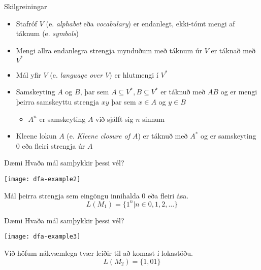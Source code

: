 \documentclass[handout]{beamer}
\begin{document}
\begin{frame}{Skilgreiningar}
    \begin{itemize}
        \item Stafróf $V$ (e. \emph{alphabet} eða \emph{vocabulary}) er endanlegt, ekki-tómt mengi af táknum (e. \emph{symbols})
        \item Mengi allra endanlegra strengja mynduðum með táknum úr $V$ er táknað með $V^*$
        \item Mál yfir $V$ (e. \emph{language over $V$}) er hlutmengi í $V^*$
        \item Samskeyting $A$ og $B$, þar sem $A\subseteq V^*,B\subseteq V^*$ er táknuð með $AB$ og er mengi þeirra samskeyttu strengja $xy$ þar sem $x\in A$ og $y \in B$
        \begin{itemize}
            \item $A^n$ er samskeyting $A$ við sjálft sig $n$ sinnum
        \end{itemize}
        \item Kleene lokun $A$ (e. \emph{Kleene closure of $A$}) er táknuð með $A^*$ og er samskeyting 0 eða fleiri strengja úr $A$
    \end{itemize}
\end{frame}

\begin{frame}{Dæmi}
Hvaða mál samþykkir þessi vél?

\begin{center}
\texttt{[image: dfa-example2]}
\end{center}

\pause
Mál þeirra strengja sem eingöngu innihalda 0 eða fleiri ása.
\[
 L(M_1) = \{1^n | n \in 0, 1, 2, \ldots \}
\]

\end{frame}

\begin{frame}{Dæmi}
Hvaða mál samþykkir þessi vél?

\begin{center}
\texttt{[image: dfa-example3]}
\end{center}

\pause
Við höfum nákvæmlega tvær leiðir til að komast í lokastöðu.
\[
 L(M_2) = \{1,01\}
\]

\end{frame}
\end{document}
